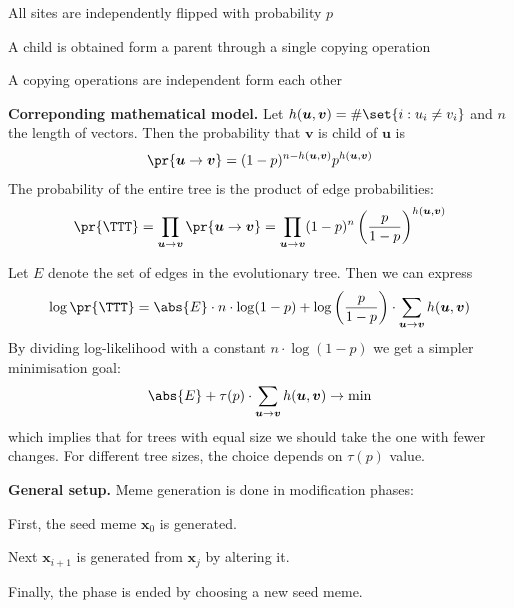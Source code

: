 \documentclass[landscape,footrule]{foils}
\renewcommand{\vec}[1]{\boldsymbol{#1}}
\begin{document}

\begin{triangles}
\item All sites are independently flipped with probability $p$
\item A child is obtained form a parent through a single copying operation
\item A copying operations are independent form each other
\end{triangles}
\vspace*{1cm}


\textbf{Correponding mathematical model.}
Let $h(\vec{u},\vec{v})=\#\set{i: u_i\neq v_i}$ and $n$ the length of vectors. Then  the probability that $\vec{v}$ is child of $\vec{u}$ is
\begin{align*}
\pr{\vec{u}\to\vec{v}}=(1-p)^{n-h(\vec{u},\vec{v})}p^{h(\vec{u},\vec{v})}
\end{align*}
The probability of the entire tree is the product of edge probabilities:
\begin{align*}
\pr{\TTT}=\prod_{\vec{u}\to\vec{v}}\pr{\vec{u}\to\vec{v}}= \prod_{\vec{u}\to\vec{v}}(1-p)^{n}\left(\frac{p}{1-p}\right)^{h(\vec{u},\vec{v})}
\end{align*}


Let $E$ denote the set of edges in the evolutionary tree. Then we can express 
\begin{align*}
\log \pr{\TTT}=\abs{E}\cdot n\cdot\log(1-p)+\log\left(\frac{p}{1-p}\right)\cdot \sum_{\vec{u}\to\vec{v}} h(\vec{u},\vec{v})
\end{align*}
By dividing log-likelihood with a constant $n\cdot\log(1-p)$ we get a simpler minimisation goal:
\begin{align*}
\abs{E}+\tau(p)\cdot \sum_{\vec{u}\to\vec{v}} h(\vec{u},\vec{v})\to\min
\end{align*}
which implies that for trees with equal size we should take the one with fewer changes. For different tree sizes, the choice depends on $\tau(p)$ value. 


\enlargethispage{1cm}

\textbf{General setup.} Meme generation is done in modification phases:
\begin{triangles}
\item First, the seed meme $\vec{x}_0$ is generated.
\item Next $\vec{x}_{i+1}$ is generated from $\vec{x}_j$ by altering it.
\item Finally, the phase is ended by choosing a new seed meme. \vspace*{2ex}
\end{triangles} 
\end{document}
